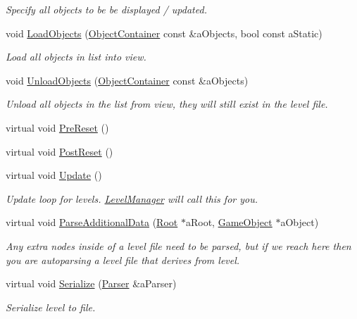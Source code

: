 \begin{DoxyCompactItemize}
\begin{DoxyCompactList}\small\item\em Specify all objects to be be displayed / updated. \end{DoxyCompactList}\item 
void \hyperlink{classLevel_ad6072eee49feb20e61bd2265d16d8264}{Load\+Objects} (\hyperlink{classLevel_afd39ad8a5d9272ab8e14853e0fb18a48}{Object\+Container} const \&a\+Objects, bool const a\+Static)
\begin{DoxyCompactList}\small\item\em Load all objects in list into view. \end{DoxyCompactList}\item 
void \hyperlink{classLevel_afb99f2699061e9a982dc53a41f66265c}{Unload\+Objects} (\hyperlink{classLevel_afd39ad8a5d9272ab8e14853e0fb18a48}{Object\+Container} const \&a\+Objects)
\begin{DoxyCompactList}\small\item\em Unload all objects in the list from view, they will still exist in the level file. \end{DoxyCompactList}\item 
virtual void \hyperlink{classLevel_acec48e8d28ea7af94ced6163d82ad246}{Pre\+Reset} ()
\item 
virtual void \hyperlink{classLevel_a1c411621a9bed5f44d3bad827ab8d859}{Post\+Reset} ()
\item 
virtual void \hyperlink{classLevel_a348ad48f5fe0a4158751778735d88230}{Update} ()
\begin{DoxyCompactList}\small\item\em Update loop for levels. \hyperlink{classLevelManager}{Level\+Manager} will call this for you. \end{DoxyCompactList}\item 
virtual void \hyperlink{classLevel_a5888bd09a0e57efc371076aed2f4dc0e}{Parse\+Additional\+Data} (\hyperlink{classRoot}{Root} $\ast$a\+Root, \hyperlink{classGameObject}{Game\+Object} $\ast$a\+Object)
\begin{DoxyCompactList}\small\item\em Any extra nodes inside of a level file need to be parsed, but if we reach here then you are autoparsing a level file that derives from level. \end{DoxyCompactList}\item 
virtual void \hyperlink{classLevel_a0a4c263cafc00090250f17045a2d23a2}{Serialize} (\hyperlink{classParser}{Parser} \&a\+Parser)
\begin{DoxyCompactList}\small\item\em Serialize level to file. \end{DoxyCompactList}\item 

\end{DoxyCompactItemize}
